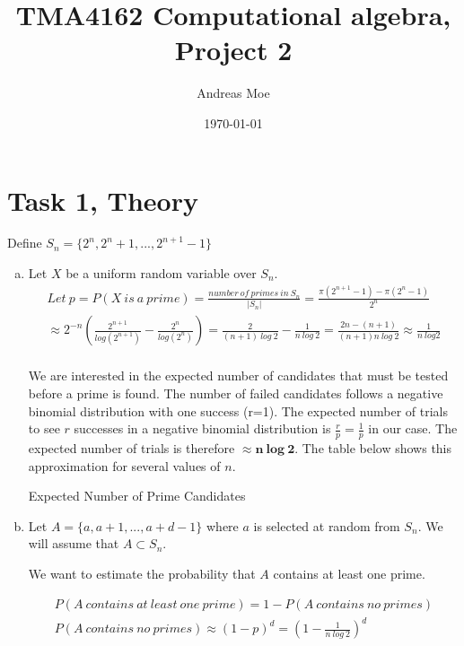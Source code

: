 \documentclass[12pt,a4paper]{article}
\title{TMA4162 Computational algebra, Project 2}
\author{Andreas Moe}
\date{\today}
\begin{document}
\maketitle

\section*{Task 1, Theory}
Define \(S_n = \{2^n, 2^n+1, ... , 2^{n+1}-1\}\)
\begin{enumerate}[a)]
    \item
    Let \(X\) be a uniform random variable over \(S_n\).
    \begin{gather*}
        Let\ p = P(X\ is\ a\ prime) = \frac{number\ of\ primes\ in\ S_n}{|S_n|}
        = \frac{\pi(2^{n+1}-1) - \pi(2^n-1)}{2^n}\\
        \approx 2^{-n}\left(\frac{2^{n+1}}{log(2^{n+1})}-\frac{2^n}{log(2^n)}\right)
        = \frac{2}{(n+1)\ log\ 2}-\frac{1}{n\ log\ 2}
        = \frac{2n - (n+1)}{(n+1)n\ log\ 2}
        \approx \frac{1}{n\ log 2}\\
    \end{gather*}

    \vspace{20pt}
    We are interested in the expected number of candidates that must be tested before a prime is found. The number of failed candidates follows a negative binomial distribution with one success (r=1). The expected number of trials to see \(r\) successes in a negative binomial distribution is \(\frac{r}{p} = \frac{1}{p}\) in our case.
    The expected number of trials is therefore \(\approx \mathbf{n\ log\ 2}\).
    The table below shows this approximation for several values of \(n\).
        {\begin{table}[H]
             \centering
             \caption{Expected Number of Prime Candidates}
             \label{tab:exp_prime_candidates}
             
        \end{table}}

    \item
    Let \(A = \{a, a+1, ... , a + d - 1\}\) where \(a\) is selected at random from \(S_n\).
    We will assume that \(A \subset S_n\).

    We want to estimate the probability that \(A\) contains at least one prime.

    \begin{gather*}
        P(A\ contains\ at\ least\ one\ prime) = 1 - P(A\ contains\ no\ primes)\\
        P(A\ contains\ no\ primes) \approx (1-p)^d = \left(1-\frac{1}{n\ log\ 2}\right)^d
    \end{gather*}


\end{enumerate}
\end{document}
